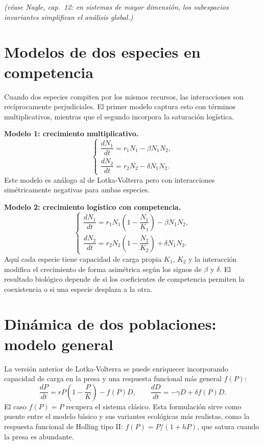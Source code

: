 \documentclass[11pt,letterpaper]{article}
\newcommand{\naglecite}[1]{\emph{(véase Nagle, #1)}}
\begin{document}
\naglecite{cap.~12: en sistemas de mayor dimensión, los subespacios invariantes
simplifican el análisis global.}

\section{Modelos de dos especies en competencia}
\label{sec:competencia}

Cuando dos especies compiten por los mismos recursos, las interacciones
son recíprocamente perjudiciales. El primer modelo captura esto con términos
multiplicativos, mientras que el segundo incorpora la saturación logística.

\textbf{Modelo 1: crecimiento multiplicativo.}
\[
\begin{cases}
\dfrac{dN_1}{dt}=r_1 N_1 - \beta N_1 N_2,\\[4pt]
\dfrac{dN_2}{dt}=r_2 N_2 - \delta N_1 N_2.
\end{cases}
\]
Este modelo es análogo al de Lotka-Volterra pero con interacciones simétricamente
negativas para ambas especies.

\textbf{Modelo 2: crecimiento logístico con competencia.}
\[
\begin{cases}
\dfrac{dN_1}{dt}=r_1 N_1\!\left(1-\dfrac{N_1}{K_1}\right)-\beta N_1 N_2,\\[4pt]
\dfrac{dN_2}{dt}=r_2 N_2\!\left(1-\dfrac{N_2}{K_2}\right)+\delta N_1 N_2.
\end{cases}
\]
Aquí cada especie tiene capacidad de carga propia $K_1$, $K_2$ y la interacción
modifica el crecimiento de forma asimétrica según los signos de $\beta$ y $\delta$.
El resultado biológico depende de si los coeficientes de competencia permiten
la coexistencia o si una especie desplaza a la otra.

\section{Dinámica de dos poblaciones: modelo general}
\label{sec:modelo-general-dos-poblaciones}

La versión anterior de Lotka-Volterra se puede enriquecer incorporando
capacidad de carga en la presa y una respuesta funcional más general $f(P)$:
\[
\frac{dP}{dt}=rP\!\left(1-\frac{P}{K}\right)-f(P)D,\qquad
\frac{dD}{dt}=-\gamma D+\delta f(P)D.
\]
El caso $f(P)=P$ recupera el sistema clásico. Esta formulación sirve como
puente entre el modelo básico y sus variantes ecológicas más realistas, como
la respuesta funcional de Holling tipo II: $f(P)=P/(1+hP)$, que satura
cuando la presa es abundante.
\end{document}
